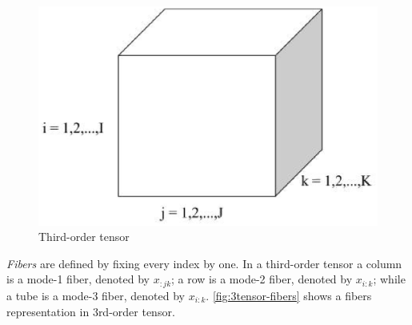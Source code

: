 \documentclass[letterpaper,12pt]{article}
\begin{document}
\begin{figure}[!ht]
\centering
 \includegraphics[scale=0.4]{Images/3rd-order_tensor.eps}
 \caption{Third-order tensor}\label{fig:3tensor}
\end{figure}

\textit{Fibers} are defined by fixing every index by one. In a third-order tensor a column is a mode-1 fiber, denoted by $x_{:jk}$; a row is a mode-2 fiber, denoted by $x_{i:k}$; while a tube is a mode-3 fiber, denoted by $x_{i:k}$. \ref{fig:3tensor-fibers} shows a fibers representation in 3rd-order tensor.
\end{document}
